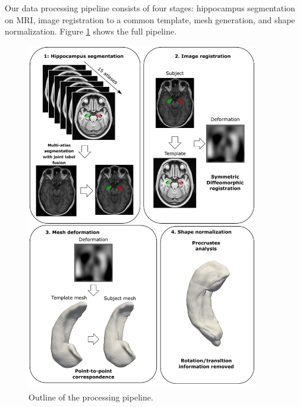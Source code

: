 Our data processing pipeline consists of four stages: hippocampus segmentation on MRI, image registration to a common template, mesh generation, and shape normalization. Figure \ref{fig:pipeline} shows the full pipeline.

\begin{figure}[htbp]
  \centering
  \includegraphics[width=0.9\textwidth]{figures/hippocampus/figure_pipeline.pdf}
  \caption{Outline of the processing pipeline.}\label{fig:pipeline}
\end{figure}


